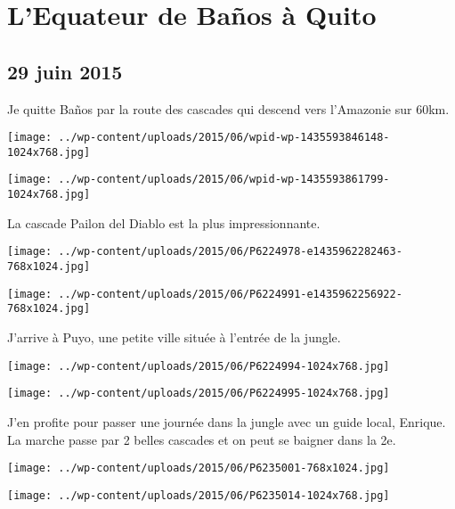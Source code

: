 \chapter{L’Equateur de Baños à Quito}
\section*{29 juin 2015}
Je quitte Baños par la route des cascades qui descend vers l'Amazonie sur 60km. \newline
 \newline
\centerline{\texttt{[image: ../wp-content/uploads/2015/06/wpid-wp-1435593846148-1024x768.jpg]} } 
 \newline
 \newline
\centerline{\texttt{[image: ../wp-content/uploads/2015/06/wpid-wp-1435593861799-1024x768.jpg]} } 
 \newline
 La cascade Pailon del Diablo est la plus impressionnante. \newline
 \newline
\centerline{\texttt{[image: ../wp-content/uploads/2015/06/P6224978-e1435962282463-768x1024.jpg]} } 
 \newline
 \newline
\centerline{\texttt{[image: ../wp-content/uploads/2015/06/P6224991-e1435962256922-768x1024.jpg]} } 
 \newline
 J'arrive à Puyo, une petite ville située à l'entrée de la jungle. \newline
 \newline
\centerline{\texttt{[image: ../wp-content/uploads/2015/06/P6224994-1024x768.jpg]} } 
 \newline
 \newline
\centerline{\texttt{[image: ../wp-content/uploads/2015/06/P6224995-1024x768.jpg]} } 
 \newline
 J'en profite pour passer une journée dans la jungle avec un guide local, Enrique. \newline
 La marche passe par 2 belles cascades et on peut se baigner dans la 2e. \newline
 \newline
\centerline{\texttt{[image: ../wp-content/uploads/2015/06/P6235001-768x1024.jpg]} } 
 \newline
 \newline
\centerline{\texttt{[image: ../wp-content/uploads/2015/06/P6235014-1024x768.jpg]} } 
 \newline
